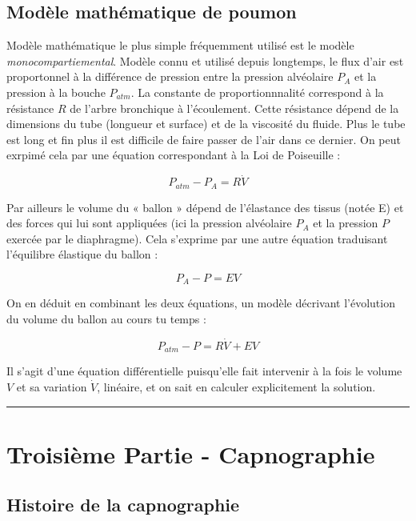 \documentclass[12pt,]{article}
\begin{document}
\hypertarget{modele-mathematique-de-poumon}{%
\subsection{Modèle mathématique de
poumon}\label{modele-mathematique-de-poumon}}

Modèle mathématique le plus simple fréquemment utilisé est le modèle
\emph{monocompartiemental}. Modèle connu et utilisé depuis longtemps, le
flux d'air est proportonnel à la différence de pression entre la
pression alvéolaire \(P_{A}\) et la pression à la bouche \(P_{atm}\). La
constante de proportionnnalité correspond à la résistance \(R\) de
l'arbre bronchique à l'écoulement. Cette résistance dépend de la
dimensions du tube (longueur et surface) et de la viscosité du fluide.
Plus le tube est long et fin plus il est difficile de faire passer de
l'air dans ce dernier. On peut exrpimé cela par une équation
correspondant à la Loi de Poiseuille :

\[ P_{atm}-P_{A}=R\dot{V} \]

Par ailleurs le volume du « ballon » dépend de l'élastance des tissus
(notée E) et des forces qui lui sont appliquées (ici la pression
alvéolaire \(P_{A}\) et la pression \(P\) exercée par le diaphragme).
Cela s'exprime par une autre équation traduisant l'équilibre élastique
du ballon :

\[ P_{A}-P=EV \]

On en déduit en combinant les deux équations, un modèle décrivant
l'évolution du volume du ballon au cours tu temps :

\[ P_{atm}-P=R \dot{V}+EV \]

Il s'agit d'une équation différentielle puisqu'elle fait intervenir à la
fois le volume \(V\) et sa variation \(\dot{V}\), linéaire, et on sait
en calculer explicitement la solution.

\pagebreak

\begin{center}\rule{0.5\linewidth}{\linethickness}\end{center}

\hypertarget{troisieme-partie---capnographie}{%
\section{Troisième Partie -
Capnographie}\label{troisieme-partie---capnographie}}

\hypertarget{histoire-de-la-capnographie}{%
\subsection{Histoire de la
capnographie}\label{histoire-de-la-capnographie}}
\end{document}

